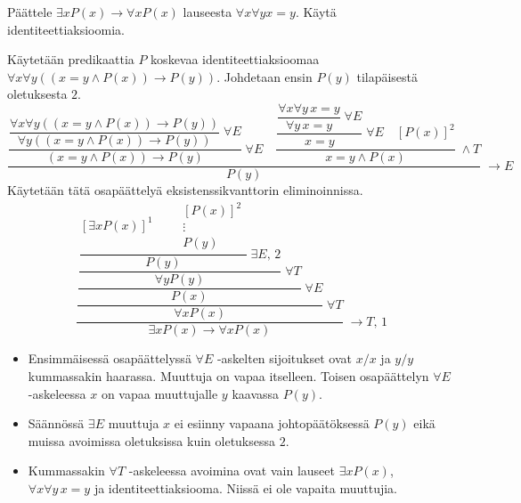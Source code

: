 \documentclass[11pt,a4paper]{amsart}
\begin{document}
\begin{exercise}
  Päättele \(\exists xP(x) \to \forall xP(x)\) lauseesta
  \(\forall x\forall y x = y\). Käytä identiteettiaksioomia.
\end{exercise}

\begin{solution}
  Käytetään predikaattia \(P\) koskevaa identiteettiaksioomaa
  \(\forall x\forall y((x=y\land P(x))\to P(y))\).
  Johdetaan ensin \(P(y)\) tilapäisestä oletuksesta \(2\).
  \[
    \dfrac{
      \dfrac{
        \dfrac{\forall x\forall y((x=y\land P(x))\to P(y))}
        {\forall y((x=y\land P(x))\to P(y))}\;\forall E
      }{(x=y\land P(x))\to P(y)}\;\forall E
      \quad
      \dfrac{
        \dfrac{
          \dfrac{\forall x\forall y\,x=y}{\forall y\,x=y}\;\forall E
        }{x=y}\;\forall E
        \quad [P(x)]^2
      }{x=y\land P(x)}\;\land T
    }{P(y)}\;\to E
  \]
  Käytetään tätä osapäättelyä eksistenssikvanttorin eliminoinnissa.
  \[
    \dfrac{
      \dfrac{
        \dfrac{
          \dfrac{
            \dfrac{
              [\exists xP(x)]^1
              \qquad
              \begin{gathered}
                [P(x)]^2 \\
                \vdots \\
                P(y)
              \end{gathered}
            }{P(y)}\;\exists E,\,2
          }{\forall yP(y)}\;\forall T
        }{P(x)}\;\forall E
      }{\forall xP(x)}\;\forall T
    }{\exists xP(x)\to\forall xP(x)}\;\to T,\,1
  \]
  \begin{itemize}
    \item Ensimmäisessä osapäättelyssä \(\forall E\) -askelten
      sijoitukset ovat \(x/x\) ja \(y/y\) kummassakin haarassa.
      Muuttuja on vapaa itselleen. Toisen osapäättelyn \(\forall E\)
      -askeleessa \(x\) on vapaa muuttujalle \(y\) kaavassa \(P(y)\).
    \item Säännössä \(\exists E\) muuttuja \(x\) ei esiinny vapaana
      johtopäätöksessä \(P(y)\) eikä muissa avoimissa oletuksissa kuin
      oletuksessa \(2\).
    \item Kummassakin \(\forall T\) -askeleessa avoimina ovat vain
      lauseet \(\exists xP(x)\), \(\forall x\forall y\,x=y\) ja
      identiteettiaksiooma. Niissä ei ole vapaita muuttujia.\qedhere
  \end{itemize}
\end{solution}
\end{document}
